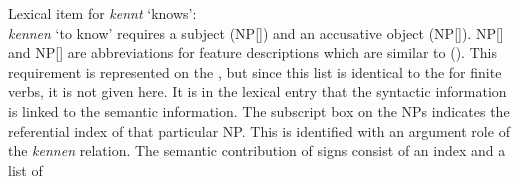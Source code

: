 {%
\eas
Lexical item for \emph{kennt} `knows':\\
\label{le-kennt}
\zs
%
\emph{kennen} `to know' requires a subject (NP[]) and an accusative object (NP[]).
NP[] and NP[] are abbreviations for feature descriptions which are similar to
(). This requirement is represented on the \argstl, but since this list is identical to the
\compsl for finite verbs, it is not given here. It is in the lexical entry that the syntactic
information is linked to the semantic information. The subscript box on the NPs indicates the
referential index of that particular NP. This is identified with an argument role of the
\emph{kennen} relation. The semantic contribution of signs consist of an index and a list of
}
